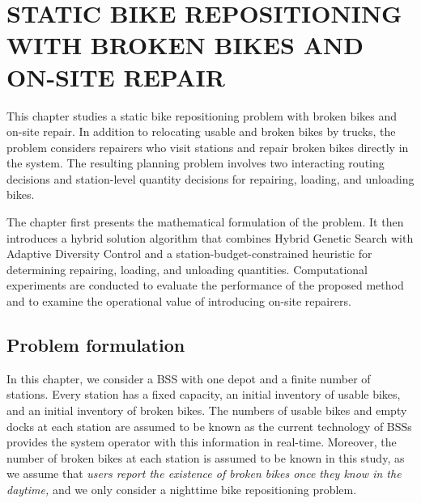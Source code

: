 \chapter[STATIC BRP WITH BROKEN BIKES AND REPAIR]{STATIC BIKE REPOSITIONING WITH BROKEN BIKES AND ON-SITE REPAIR}

This chapter studies a static bike repositioning problem with broken bikes and on-site repair. In addition to relocating usable and broken bikes by trucks, the problem considers repairers who visit stations and repair broken bikes directly in the system. The resulting planning problem involves two interacting routing decisions and station-level quantity decisions for repairing, loading, and unloading bikes.

The chapter first presents the mathematical formulation of the problem. It then introduces a hybrid solution algorithm that combines Hybrid Genetic Search with Adaptive Diversity Control and a station-budget-constrained heuristic for determining repairing, loading, and unloading quantities. Computational experiments are conducted to evaluate the performance of the proposed method and to examine the operational value of introducing on-site repairers.

\section{Problem formulation}\label{ch4:sec:problem-formulation}

In this chapter, we consider a BSS with one depot and a finite number of stations. Every station has a
fixed capacity, an initial inventory of usable bikes, and an initial inventory of broken bikes. The
numbers of usable bikes and empty docks at each station are assumed to be known as the current
technology of BSSs provides the system operator with this information in real-time. Moreover, the
number of broken bikes at each station is assumed to be known in this study, as we assume that
\emph{users report the existence of broken bikes once they know in the daytime,} and we only
consider a nighttime bike repositioning problem.

